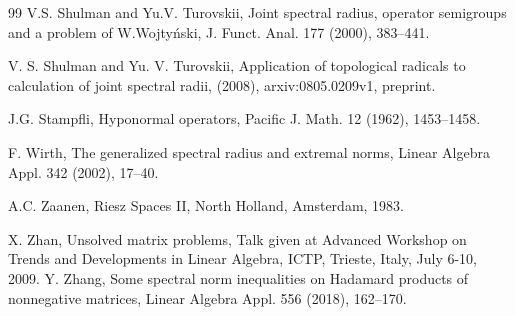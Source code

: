 \documentclass[12pt, reqno]{amsart}
\theoremstyle{definition}
\theoremstyle{remark}
\numberwithin{equation}{section}
\begin{document}
\begin{thebibliography}{99}
 V.S. Shulman and Yu.V. Turovskii, Joint spectral radius,
operator semigroups and a problem of W.Wojty\'{n}ski,  J. Funct. Anal.
177 (2000), 383--441.

 V. S. Shulman and Yu. V. Turovskii, Application of topological radicals to calculation of joint spectral radii, (2008), arxiv:0805.0209v1, preprint. %

J.G. Stampfli, Hyponormal operators,  Pacific J. Math. 12 (1962), 1453--1458.


 F. Wirth, The generalized spectral radius and extremal norms,  Linear Algebra
         Appl. 342 (2002), 17--40.

 A.C. Zaanen,
 Riesz Spaces II, North Holland, Amsterdam, 1983.

 X. Zhan,  Unsolved matrix problems, Talk given at  Advanced Workshop on Trends and Developments in Linear Algebra, ICTP, Trieste, Italy,
July 6-10, 2009.
 Y. Zhang, Some spectral norm inequalities on Hadamard products of nonnegative matrices, Linear Algebra  Appl. 556 (2018), 162--170.



\end{thebibliography}
\end{document}
